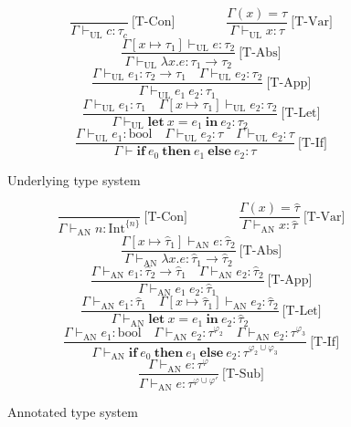 \begin{figure}[p]
\[\frac{}{\Gamma \vdash_{\mathrm{UL}} c : \tau_c}\ \textrm{[T-Con]} \quad\quad\quad\quad
\frac{\Gamma(x) = \tau}{\Gamma \vdash_{\mathrm{UL}} x : \tau}\ \textrm{[T-Var]}\]
\[\frac{\Gamma[x \mapsto \tau_1] \vdash_{\mathrm{UL}} e : \tau_2}{\Gamma \vdash_{\mathrm{UL}} \lambda x. e : \tau_1 \to \tau_2}\ \textrm{[T-Abs]}\]
\[\frac{\Gamma \vdash_{\mathrm{UL}} e_1 : \tau_2 \to \tau_1 \quad \Gamma \vdash_{\mathrm{UL}} e_2 : \tau_2}{\Gamma \vdash_{\mathrm{UL}} e_1\ e_2 : \tau_1}\ \textrm{[T-App]}\]
\[\frac{\Gamma \vdash_{\mathrm{UL}} e_1 : \tau_1 \quad \Gamma[x\mapsto \tau_1] \vdash_{\mathrm{UL}} e_2 : \tau_2}{\Gamma \vdash_{\mathrm{UL}} \mathbf{let\ } x = e_1 \mathbf{\ in\ } e_2 : \tau_2}\ \textrm{[T-Let]}\]
\[\frac{\Gamma \vdash_{\mathrm{UL}} e_1 : \mathrm{bool} \quad \Gamma \vdash_{\mathrm{UL}} e_2 : \tau \quad \Gamma \vdash_{\mathrm{UL}} e_2 : \tau}{\Gamma \vdash \mathbf{if\ } e_0 \mathbf{\ then\ } e_1 \mathbf{\ else \ } e_2 : \tau}\ \textrm{[T-If]}\]
\caption{Underlying type system}
\label{underlying}
\end{figure}

\begin{figure}[p]
\[\frac{}{\Gamma \vdash_{\mathrm{AN}} n : \mathrm{Int}^{\{n\}}}\ \textrm{[T-Con]} \quad\quad\quad\quad
\frac{\Gamma(x) = \widehat\tau}{\Gamma \vdash_{\mathrm{AN}} x : \widehat\tau}\ \textrm{[T-Var]}\]
\[\frac{\Gamma[x \mapsto \widehat\tau_1] \vdash_{\mathrm{AN}} e : \widehat\tau_2}{\Gamma \vdash_{\mathrm{AN}} \lambda x. e : \widehat\tau_1 \to \widehat\tau_2}\ \textrm{[T-Abs]}\]
\[\frac{\Gamma \vdash_{\mathrm{AN}} e_1 : \widehat\tau_2 \to \widehat\tau_1 \quad \Gamma \vdash_{\mathrm{AN}} e_2 : \widehat\tau_2}{\Gamma \vdash_{\mathrm{AN}} e_1\ e_2 : \widehat\tau_1}\ \textrm{[T-App]}\]
\[\frac{\Gamma \vdash_{\mathrm{AN}} e_1 : \widehat\tau_1 \quad \Gamma[x\mapsto \widehat\tau_1] \vdash_{\mathrm{AN}} e_2 : \widehat\tau_2}{\Gamma \vdash_{\mathrm{AN}} \mathbf{let\ } x = e_1 \mathbf{\ in\ } e_2 : \widehat\tau_2}\ \textrm{[T-Let]}\]
\[\frac{\Gamma \vdash_{\mathrm{AN}} e_1 : \mathrm{bool} \quad \Gamma \vdash_{\mathrm{AN}} e_2 : \tau^{\varphi_2} \quad \Gamma \vdash_{\mathrm{AN}} e_2 : \tau^{\varphi_3}}{\Gamma \vdash_{\mathrm{AN}} \mathbf{if\ } e_0 \mathbf{\ then\ } e_1 \mathbf{\ else \ } e_2 : \tau^{\varphi_2 \cup \varphi_3}}\ \textrm{[T-If]}\]
\[\frac{
\Gamma \vdash_{\mathrm{AN}} e : \tau^{\varphi}
}{
\Gamma \vdash_{\mathrm{AN}} e : \tau^{\varphi \cup \varphi'}
}\ \textrm{[T-Sub]}\]
\caption{Annotated type system}
\label{annotated}
\end{figure}

